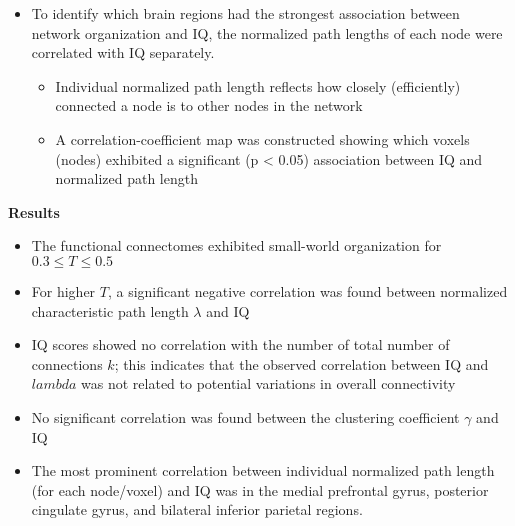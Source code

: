 \documentclass[11pt, letterpaper]{article}
\begin{document}
\begin{itemize}
{           whether intelligence was correlated with the number of connections in a brain network.}
    \item {
        To identify which brain regions had the strongest association between network organization and IQ,
        the normalized path lengths of each node were correlated with IQ separately.
        \begin{itemize}
            \item {Individual normalized path length reflects how closely (efficiently) connected a node is to 
                   other nodes in the network}
            \item {A correlation-coefficient map was constructed showing which voxels (nodes) exhibited a
                   significant (p < 0.05) association between IQ and normalized path length}
        \end{itemize} 
    }
\end{itemize}


\noindent\textbf{Results}
\begin{itemize}
    \setlength\itemsep{0.05em}
    \item The functional connectomes exhibited small-world organization for $0.3\leq T \leq0.5$
    \item {For higher $T$, a significant negative correlation was found between normalized characteristic path 
           length $\lambda$ and IQ}
    \item {IQ scores showed no correlation with the number of total number of connections $k$; this indicates that the
           observed correlation between IQ and $lambda$ was not related to potential variations in overall connectivity}
    \item No significant correlation was found between the clustering coefficient $\gamma$ and IQ
    \item {The most prominent correlation between individual normalized path length (for each node/voxel) and IQ was
           in the medial prefrontal gyrus, posterior cingulate gyrus, and bilateral inferior parietal regions}.
\end{itemize}
\end{document}
